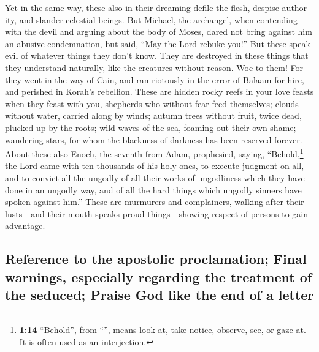 \begin{paracol}{2}
\begin{otherlanguage}{english}
 Yet in the same way, these also in their dreaming defile
the flesh, despise authority, and slander celestial beings.
 But Michael, the archangel, when contending with the
devil and arguing about the body of Moses, dared not bring against him
an abusive condemnation, but said, ``May the Lord rebuke you!''
 But these speak evil of whatever things they don't know.
They are destroyed in these things that they understand naturally, like
the creatures without reason.  Woe to them! For they went
in the way of Cain, and ran riotously in the error of Balaam for hire,
and perished in Korah's rebellion.  These are hidden
rocky reefs in your love feasts when they feast with you, shepherds who
without fear feed themselves; clouds without water, carried along by
winds; autumn trees without fruit, twice dead, plucked up by the roots;
 wild waves of the sea, foaming out their own shame;
wandering stars, for whom the blackness of darkness has been reserved
forever.  About these also Enoch, the seventh from Adam,
prophesied, saying, ``Behold,\footnote{\textbf{1:14} ``Behold'', from
  ``'', means look at, take notice, observe, see, or gaze
  at. It is often used as an interjection.} the Lord came with ten
thousands of his holy ones,  to execute judgment on all,
and to convict all the ungodly of all their works of ungodliness which
they have done in an ungodly way, and of all the hard things which
ungodly sinners have spoken against him.''  These are
murmurers and complainers, walking after their lusts---and their mouth
speaks proud things---showing respect of persons to gain advantage.

\hypertarget{reference-to-the-apostolic-proclamation-final-warnings-especially-regarding-the-treatment-of-the-seduced-praise-god-like-the-end-of-a-letter}{%
\subsection{Reference to the apostolic proclamation; Final warnings,
especially regarding the treatment of the seduced; Praise God like the
end of a
letter}\label{reference-to-the-apostolic-proclamation-final-warnings-especially-regarding-the-treatment-of-the-seduced-praise-god-like-the-end-of-a-letter}}


\end{otherlanguage}
\end{paracol}
